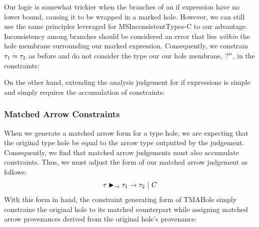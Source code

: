 Our logic is somewhat trickier when the branches of an if expression have no lower bound, causing it to be wrapped in a marked hole. However, we can still use the same principles leveraged for MSInconsistentTypes-C to our advantage. Inconsistency among branches should be considered an error that lies \emph{within} the hole membrane surrounding our marked expression. Consequently, we constrain $\TMV_1 \approx \TMV_2$ as before and do not consider the type our our hole membrane, $\TUnknown^n$, in the constraints:

\begin{mathpar}
\end{mathpar}

On the other hand, extending the analysis judgement for if expressions is simple and simply requires the accumulation of constraints:

\begin{mathpar}
\end{mathpar}

\subsubsection{Matched Arrow Constraints}
When we generate a matched arrow form for a type hole, we are expecting that the original type hole be equal to the arrow type outputted by the judgement. Consequently, we find that matched arrow judgements must also accumulate constraints. Thus, we must adjust the form of our matched arrow judgement as follows:
$$\matchedArrow{\TMV}{\TMV_1}{\TMV_2} ~|~ C$$
With this form in hand, the constraint generating form of TMAHole simply constrains the original hole to its matched counterpart while assigning matched arrow provenances derived from the original hole's provenance:

